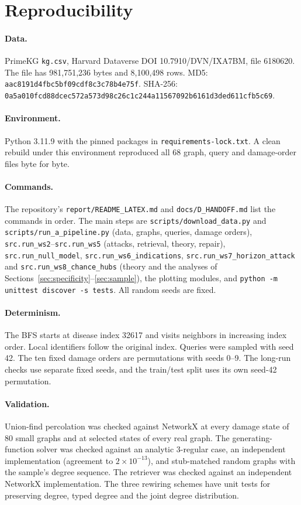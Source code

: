 \section{Reproducibility}
\label{app:repro}

\paragraph{Data.} PrimeKG \texttt{kg.csv}, Harvard Dataverse DOI
10.7910/DVN/IXA7BM, file 6180620. The file has 981,751,236 bytes and 8,100,498
rows. MD5: \texttt{aac8191d4fbc5bf09cdf8c3c78b4e75f}. SHA-256:
\texttt{0a5a010fcd88dcec572a573d98c26c1c}\allowbreak\texttt{244a11567092b6161d3ded611cfb5c69}.

\paragraph{Environment.} Python 3.11.9 with the pinned packages in
\texttt{requirements-lock.txt}. A clean rebuild under this environment reproduced
all 68 graph, query and damage-order files byte for byte.

\paragraph{Commands.} The repository's \texttt{report/README\_LATEX.md} and
\texttt{docs/D\_HANDOFF.md} list the commands in order. The main steps are
\texttt{scripts/download\_data.py} and \texttt{scripts/run\_a\_pipeline.py} (data,
graphs, queries, damage orders), \texttt{src.run\_ws2}--\texttt{src.run\_ws5}
(attacks, retrieval, theory, repair), \texttt{src.run\_null\_model},
\texttt{src.run\_ws6\_indications}, \texttt{src.run\_ws7\_horizon\_attack} and
\texttt{src.run\_ws8\_chance\_hubs} (theory and the analyses of
Sections~\ref{sec:specificity}--\ref{sec:sample}), the plotting modules, and
\texttt{python -m unittest discover -s tests}. All random seeds are fixed.

\paragraph{Determinism.} The BFS starts at disease index 32617 and visits
neighbors in increasing index order. Local identifiers follow the original
index. Queries were sampled with seed 42. The ten fixed damage orders are
permutations with seeds 0--9. The long-run checks use separate fixed seeds, and
the train/test split uses its own seed-42 permutation.

\paragraph{Validation.} Union-find percolation was checked against NetworkX at
every damage state of 80 small graphs and at selected states of every real
graph. The generating-function solver was checked against an analytic
3-regular case, an independent implementation (agreement to $2\times10^{-13}$),
and stub-matched random graphs with the sample's degree sequence. The
retriever was checked against an independent NetworkX implementation. The three
rewiring schemes have unit tests for preserving degree, typed degree and the
joint degree distribution.
